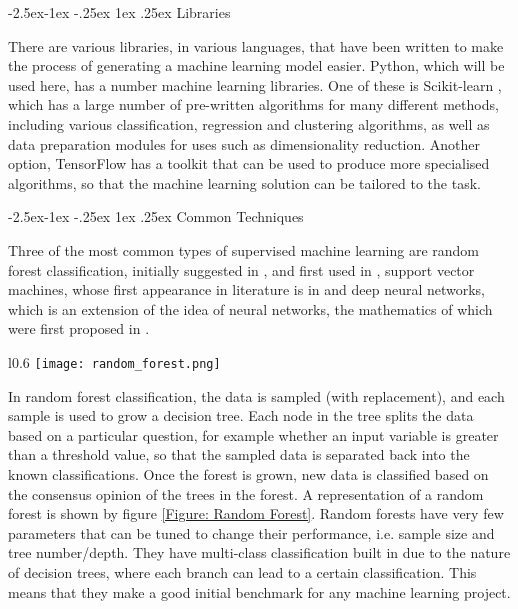 \documentclass[12pt]{article}
\makeatletter
\renewcommand\subsubsection{\@startsection{subsubsection}{4}{\z@}
            {-2.5ex\@plus -1ex \@minus -.25ex}
            {1ex \@plus .25ex}
            {\normalfont\large\bfseries}}
\makeatother
\begin{document}
			\subsubsection{Libraries}			
			
				There are various libraries, in various languages, that have been written to make the process of generating a machine learning model easier.  Python, which will be used here, has a number machine learning libraries.  One of these is Scikit-learn \citep{RefWorks:doc:5d80f150e4b07f40b9eab2f8}, which has a large number of pre-written algorithms for many different methods, including various classification, regression and clustering algorithms, as well as data preparation modules for uses such as dimensionality reduction.  Another option, TensorFlow \citep{RefWorks:doc:5d80f20de4b08a779635c81d} has a toolkit that can be used to produce more specialised algorithms, so that the machine learning solution can be tailored to the task.
				
			\subsubsection{Common Techniques}

				Three of the most common types of supervised machine learning are random forest classification, initially suggested in \cite{RefWorks:doc:5d84b84de4b03ee47d60013e}, and first used in \cite{RefWorks:doc:5d84b954e4b01cdccc094821}, support vector machines, whose first appearance in literature is in \cite{RefWorks:doc:5d84bca0e4b074abc390dc95} and deep neural networks, which is an extension of the idea of neural networks, the mathematics of which were first proposed in \cite{RefWorks:doc:5d84d2d4e4b048bf85a1aa0a}.  

		\begin{wrapfigure}{l}{0.6\textwidth}
			\centering
			\texttt{[image: random\_forest.png]}
			\caption{A simple illustration of a random forest, showing how each of a number (n) of samples makes a tree that contributes to the consensus that will be reported}
			\label{Figure: Random Forest}
		\end{wrapfigure}
		
				In random forest classification, the data is sampled (with replacement), and each sample is used to grow a decision tree.  Each node in the tree splits the data based on a particular question, for example whether an input variable is greater than a threshold value, so that the sampled data is separated back into the known classifications.  Once the forest is grown, new data is classified based on the consensus opinion of the trees in the forest.  A representation of a random forest is shown by figure \ref{Figure: Random Forest}.  Random forests have very few parameters that can be tuned to change their performance, i.e. sample size and tree number/depth.  They have multi-class classification built in due to the nature of decision trees, where each branch can lead to a certain classification.  This means that they make a good initial benchmark for any machine learning project.
		
\end{document}
